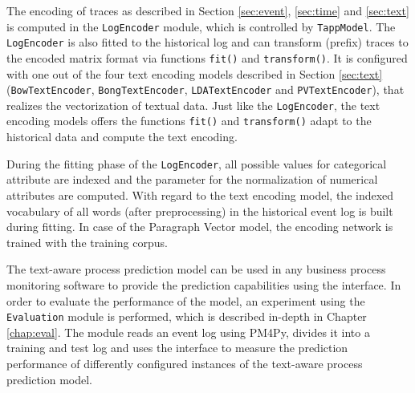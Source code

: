 The encoding of traces as described in Section \ref{sec:event}, \ref{sec:time} and \ref{sec:text} is computed in the \texttt{LogEncoder} module, which is controlled by \texttt{TappModel}.
The \texttt{LogEncoder} is also fitted to the historical log and can transform (prefix) traces to the encoded matrix format via functions \texttt{fit()} and \texttt{transform()}.
It is configured with one out of the four text encoding models described in Section \ref{sec:text} (\texttt{BowTextEncoder},  \texttt{BongTextEncoder}, \texttt{LDATextEncoder} and  \texttt{PVTextEncoder}), that realizes the vectorization of textual data.
Just like the \texttt{LogEncoder}, the text encoding models offers the functions \texttt{fit()} and \texttt{transform()} adapt to the historical data and compute the text encoding.

During the fitting phase of the  \texttt{LogEncoder}, all possible values for categorical attribute are indexed and the parameter for the normalization of numerical attributes are computed.
With regard to the text encoding model, the indexed vocabulary of all words (after preprocessing) in the historical event log is built during fitting.
In case of the Paragraph Vector model, the encoding network is trained with the training corpus.

The text-aware process prediction model can be used in any business process monitoring software to provide the prediction capabilities using the interface.
In order to evaluate the performance of the model, an experiment using the \texttt{Evaluation} module is performed, which is described in-depth in Chapter \ref{chap:eval}.
The module reads an event log using PM4Py, divides it into a training and test log and uses the interface to measure the prediction performance of differently configured instances of the text-aware process prediction model.